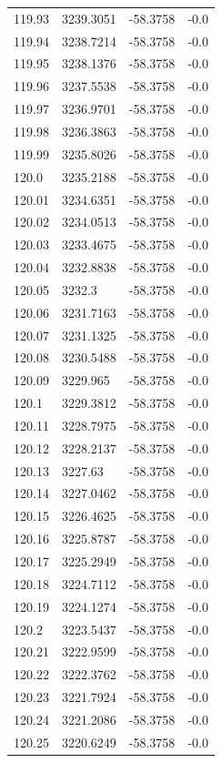 \begin{table}[H]
\begin{tabular}{llll}
119.93 & 3239.3051 & -58.3758 & -0.0 \\
119.94 & 3238.7214 & -58.3758 & -0.0 \\
119.95 & 3238.1376 & -58.3758 & -0.0 \\
119.96 & 3237.5538 & -58.3758 & -0.0 \\
119.97 & 3236.9701 & -58.3758 & -0.0 \\
119.98 & 3236.3863 & -58.3758 & -0.0 \\
119.99 & 3235.8026 & -58.3758 & -0.0 \\
120.0 & 3235.2188 & -58.3758 & -0.0 \\
120.01 & 3234.6351 & -58.3758 & -0.0 \\
120.02 & 3234.0513 & -58.3758 & -0.0 \\
120.03 & 3233.4675 & -58.3758 & -0.0 \\
120.04 & 3232.8838 & -58.3758 & -0.0 \\
120.05 & 3232.3 & -58.3758 & -0.0 \\
120.06 & 3231.7163 & -58.3758 & -0.0 \\
120.07 & 3231.1325 & -58.3758 & -0.0 \\
120.08 & 3230.5488 & -58.3758 & -0.0 \\
120.09 & 3229.965 & -58.3758 & -0.0 \\
120.1 & 3229.3812 & -58.3758 & -0.0 \\
120.11 & 3228.7975 & -58.3758 & -0.0 \\
120.12 & 3228.2137 & -58.3758 & -0.0 \\
120.13 & 3227.63 & -58.3758 & -0.0 \\
120.14 & 3227.0462 & -58.3758 & -0.0 \\
120.15 & 3226.4625 & -58.3758 & -0.0 \\
120.16 & 3225.8787 & -58.3758 & -0.0 \\
120.17 & 3225.2949 & -58.3758 & -0.0 \\
120.18 & 3224.7112 & -58.3758 & -0.0 \\
120.19 & 3224.1274 & -58.3758 & -0.0 \\
120.2 & 3223.5437 & -58.3758 & -0.0 \\
120.21 & 3222.9599 & -58.3758 & -0.0 \\
120.22 & 3222.3762 & -58.3758 & -0.0 \\
120.23 & 3221.7924 & -58.3758 & -0.0 \\
120.24 & 3221.2086 & -58.3758 & -0.0 \\
120.25 & 3220.6249 & -58.3758 & -0.0 \\

\end{tabular}
\end{table}
